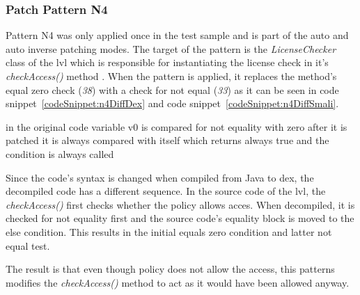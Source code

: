 \subsubsection{Patch Pattern N4}
Pattern N4 was only applied once in the test sample and is part of the auto and auto inverse patching modes.
The target of the pattern is the \textit{LicenseChecker} class of the \gls{lvl} which is responsible for instantiating the license check in it's \textit{checkAccess()} method \cite{developersLicensingReference}.
\newline
When the pattern is applied, it replaces the method's equal zero check (\textit{38}) with a check for not equal (\textit{33}) as it can be seen in code snippet~\ref{codeSnippet:n4DiffDex} and code snippet~\ref{codeSnippet:n4DiffSmali}.
\newline



in the original code variable v0 is compared for not equality with zero
after it is patched it is always compared with itself which returns always true and the condition is always called

Since the code's syntax is changed when compiled from Java to dex, the decompiled code has a different sequence.
In the source code of the \gls{lvl}, the \textit{checkAccess()} first checks whether the policy allows acces.
When decompiled, it is checked for not equality first and the source code's equality block is moved to the else condition.
This results in the initial equals zero condition and latter not equal test.



The result is that even though policy does not allow the access, this patterns modifies the \textit{checkAccess()} method to act as it would have been allowed anyway.


